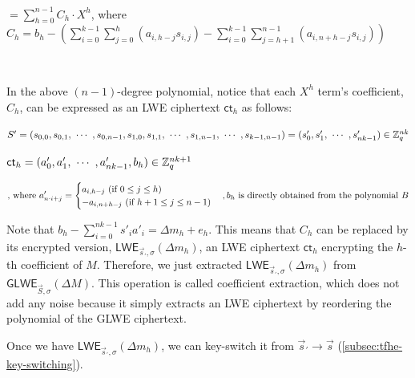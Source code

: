 $ $

$= \sum\limits_{h=0}^{n-1}  C_h \cdot X^{h}  $, where $C_h = b_h - \left(  \sum\limits_{i=0}^{k-1} \sum\limits_{j=0}^{h}(a_{i,h-j}s_{i,j}) - \sum\limits_{i=0}^{k-1} \sum\limits_{j=h+1}^{n-1}(a_{i,n+h-j}s_{i,j})  \right)$

$ $

\noindent In the above $(n-1)$-degree polynomial, notice that each $X^h$ term's coefficient, $C_h$, can be expressed as an LWE ciphertext $\textsf{ct}_h$ as follows:

$S' = (s_{0,0}, s_{0,1}, \text{ } \text{$\cdots$} \text{ }, s_{0,n-1}, s_{1,0}, s_{1,1}, \text{ } \text{$\cdots$} \text{ }, s_{1, n-1}, \text{ } \text{$\cdots$} \text{ }, s_{k-1, n-1}) = (s'_0, s'_1, \text{ } \text{$\cdots$} \text{ }, s'_{nk-1} ) \in \mathbb{Z}_q^{nk}$


$\textsf{ct}_h = (a'_0, a'_1, \text{ } \text{$\cdots$} \text{ }, a'_{nk-1}, b_h) \in \mathbb{Z}_q^{nk + 1}$


\[
    \text{, where } a'_{n \cdot i + j} =   
\begin{cases}
    a_{i,h - j} \text{ (if } 0 \leq j \leq h\text{)}\\
    -a_{i,n + h - j} \text{ (if } h+1 \leq j \leq n-1\text{)}\\
\end{cases}
\centering , b_h \text{ is directly obtained from the polynomial } B
\]


\noindent Note that $b_h - \sum\limits_{i=0}^{nk-1}s'_ia'_i = \Delta m_h + e_h$. This means that $C_h$ can be replaced by its encrypted version, $\textsf{LWE}_{\vec{s}_{'}, \sigma}(\Delta m_h)$, an LWE ciphertext $\textsf{ct}_h$ encrypting the $h$-th coefficient of $M$. Therefore, we just extracted $\textsf{LWE}_{\vec{s}_{'}, \sigma}(\Delta m_h)$ from $\textsf{GLWE}_{\vec{S}, \sigma}(\Delta M)$. This operation is called coefficient extraction, which does not add any noise because it simply extracts an LWE ciphertext by reordering the polynomial of the GLWE ciphertext. 

Once we have $\textsf{LWE}_{\vec{s}_{'}, \sigma}(\Delta m_h)$, we can key-switch it from $\vec{s}_{'} \rightarrow \vec{s}$ (\autoref{subsec:tfhe-key-switching}). 


